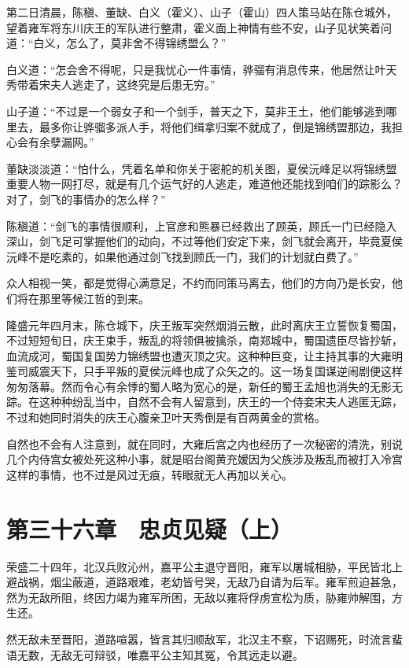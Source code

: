 第二日清晨，陈稹、董缺、白义（霍义）、山子（霍山）四人策马站在陈仓城外，望着雍军将东川庆王的军队进行整肃，霍义面上神情有些不安，山子见状笑着问道：“白义，怎么了，莫非舍不得锦绣盟么？”

白义道：“怎会舍不得呢，只是我忧心一件事情，骅骝有消息传来，他居然让叶天秀带着宋夫人逃走了，这终究是后患无穷。”

山子道：“不过是一个弱女子和一个剑手，普天之下，莫非王土，他们能够逃到哪里去，最多你让骅骝多派人手，将他们缉拿归案不就成了，倒是锦绣盟那边，我担心会有余孽漏网。”

董缺淡淡道：“怕什么，凭着名单和你关于密舵的机关图，夏侯沅峰足以将锦绣盟重要人物一网打尽，就是有几个运气好的人逃走，难道他还能找到咱们的踪影么？对了，剑飞的事情办的怎么样？”

陈稹道：“剑飞的事情很顺利，上官彦和熊暴已经救出了顾英，顾氏一门已经隐入深山，剑飞足可掌握他们的动向，不过等他们安定下来，剑飞就会离开，毕竟夏侯沅峰不是吃素的，如果他通过剑飞找到顾氏一门，我们的计划就白费了。”

众人相视一笑，都是觉得心满意足，不约而同策马离去，他们的方向乃是长安，他们将在那里等候江哲的到来。

隆盛元年四月末，陈仓城下，庆王叛军突然烟消云散，此时离庆王立誓恢复蜀国，不过短短旬日，庆王束手，叛乱的将领俱被擒杀，南郑城中，蜀国遗臣尽皆抄斩，血流成河，蜀国复国势力锦绣盟也遭灭顶之灾。这种种巨变，让主持其事的大雍明鉴司威震天下，只手平叛的夏侯沅峰也成了众矢之的。这一场复国谋逆闹剧便这样匆匆落幕。然而令心有余悸的蜀人略为宽心的是，新任的蜀王孟旭也消失的无影无踪。在这种种纷乱当中，自然不会有人留意到，庆王的一个侍妾宋夫人逃匿无踪，不过和她同时消失的庆王心腹亲卫叶天秀倒是有百两黄金的赏格。

自然也不会有人注意到，就在同时，大雍后宫之内也经历了一次秘密的清洗，别说几个内侍宫女被处死这种小事，就是昭台阁黄充嫒因为父族涉及叛乱而被打入冷宫这样的事情，也不过是风过无痕，转眼就无人再加以关心。

\chapter{第三十六章　忠贞见疑（上）}

荣盛二十四年，北汉兵败沁州，嘉平公主退守晋阳，雍军以屠城相胁，平民皆北上避战祸，烟尘蔽道，道路艰难，老幼皆号哭，无敌乃自请为后军。雍军煎迫甚急，然为无敌所阻，终因力竭为雍军所困，无敌以雍将俘虏宣松为质，胁雍帅解围，方生还。

然无敌未至晋阳，道路喧嚣，皆言其归顺敌军，北汉主不察，下诏赐死，时流言蜚语无数，无敌无可辩驳，唯嘉平公主知其冤，令其远走以避。

